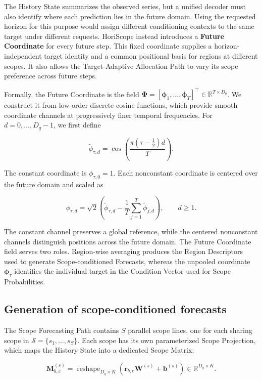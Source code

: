 \documentclass[final,3p,times]{elsarticle}
\begin{document}
The History State summarizes the observed series, but a unified decoder must also identify where each prediction lies in the future domain. Using the requested horizon for this purpose would assign different conditioning contexts to the same target under different requests. HoriScope instead introduces a \textbf{Future Coordinate} for every future step. This fixed coordinate supplies a horizon-independent target identity and a common positional basis for regions at different scopes. It also allows the Target-Adaptive Allocation Path to vary its scope preference across future steps.

Formally, the Future Coordinate is the field $\boldsymbol\Phi=[\boldsymbol\phi_1,\ldots,\boldsymbol\phi_T]^\top\in\mathbb R^{T\times D_q}$. We construct it from low-order discrete cosine functions, which provide smooth coordinate channels at progressively finer temporal frequencies. For $d=0,\ldots,D_q-1$, we first define

\[
\widetilde\phi_{\tau,d}
=
\cos\!\left(
\frac{\pi(\tau-\tfrac12)d}{T}
\right).
\]


The constant coordinate is $\phi_{\tau,0}=1$. Each nonconstant coordinate is centered over the future domain and scaled as

\[
\phi_{\tau,d}
=
\sqrt{2}
\left(
\widetilde\phi_{\tau,d}
-
\frac{1}{T}
\sum_{j=1}^{T}
\widetilde\phi_{j,d}
\right),
\qquad d\geq 1.
\]


The constant channel preserves a global reference, while the centered nonconstant channels distinguish positions across the future domain. The Future Coordinate field serves two roles. Region-wise averaging produces the Region Descriptors used to generate Scope-conditioned Forecasts, whereas the unpooled coordinate $\boldsymbol\phi_\tau$ identifies the individual target in the Condition Vector used for Scope Probabilities.

\subsection{Generation of scope-conditioned forecasts}


The Scope Forecasting Path contains $S$ parallel scope lines, one for each sharing scope in $\mathcal S=\{s_1,\ldots,s_S\}$. Each scope has its own parameterized Scope Projection, which maps the History State into a dedicated Scope Matrix:

\[
\mathbf M_{b,c}^{(s)}
=
\operatorname{reshape}_{D_q\times K}
\left(
\mathbf r_{b,c}\mathbf W^{(s)}
+
\mathbf b^{(s)}
\right)
\in\mathbb R^{D_q\times K}.
\]
\end{document}
